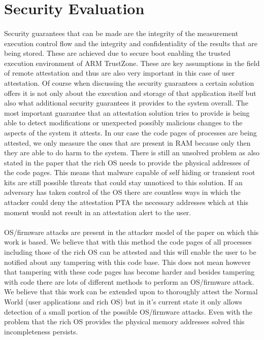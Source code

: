 \section{Security Evaluation}

\paragraph*{}%
Security guarantees that can be made are the integrity of the measurement execution control flow and the integrity and confidentiality of the results that are being stored. These are achieved due to secure boot enabling the trusted execution environment of ARM TrustZone. These are key assumptions in the field of remote attestation and thus are also very important in this case of user attestation. Of course when discussing the security guarantees a certain solution offers it is not only about the execution and storage of that application itself but also what additional security guarantees it provides to the system overall. The most important guarantee that an attestation solution tries to provide is being able to detect modifications or unexpected possibly malicious changes to the aspects of the system it attests. In our case the code pages of processes are being attested, we only measure the ones that are present in RAM because only then they are able to do harm to the system. There is still an unsolved problem as also stated in the paper that the rich OS needs to provide the physical addresses of the code pages. This means that malware capable of self hiding or transient root kits are still possible threats that could stay unnoticed to this solution. If an adversary has taken control of the OS there are countless ways in which the attacker could deny the attestation PTA the necessary addresses which at this moment would not result in an attestation alert to the user.

\paragraph*{}%
OS/firmware attacks are present in the attacker model of the paper on which this work is based. We believe that with this method the code pages of all processes including those of the rich OS can be attested and this will enable the user to be notified about any tampering with this code base. This does not mean however that tampering with these code pages has become harder and besides tampering with code there are lots of different methods to perform an OS/firmware attack. We believe that this work can be extended upon to thoroughly attest the Normal World (user applications and rich OS) but in it's current state it only allows detection of a small portion of the possible OS/firmware attacks. Even with the problem that the rich OS provides the physical memory addresses solved this incompleteness persists.


